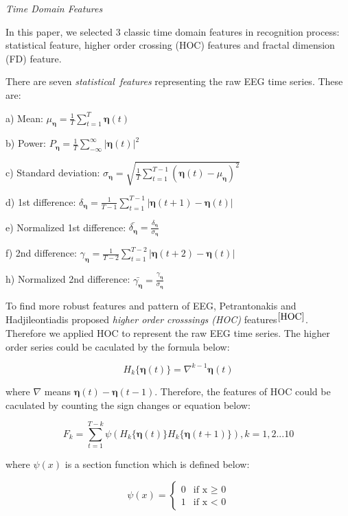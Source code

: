 \documentclass[runningheads,a4paper]{llncs}
\begin{document}
\emph{Time Domain Features}

In this paper, we selected 3 classic time domain features in recognition process: statistical feature,
higher order crossing (HOC) features and fractal dimension (FD) feature.

There are seven \emph{statistical\ features} representing the
raw EEG time series. These are:

a) Mean: ${\mu}_{\bm{\eta}} = \frac{1}{T}\sum_{t=1}^T \bm{\eta}(t)$

b) Power: $P_{\bm{\eta}} = \frac{1}{T}\sum_{-\infty}^{\infty} |{\bm{\eta}}(t)|^2 $

c) Standard deviation: $\sigma_{\bm{\eta}} = \sqrt{ \frac{1}{T} \sum_{t=1}^{T-1} ({\bm{\eta}}(t) - {\mu}_{\bm{\eta}})^2 }$

d) 1st difference: $\delta_{\bm{\eta}} = \frac{1}{T-1}\sum_{t=1}^{T-1}|{\bm{\eta}}(t+1) - {\bm{\eta}}(t)|$

e) Normalized 1st difference: $ \bar{\delta_{\bm{\eta}}} = \frac{ \delta_{\bm{\eta}}}{\sigma_{\bm{\eta}}}$

f) 2nd difference: $\gamma_{\bm{\eta}} = \frac{1}{T-2}\sum_{t=1}^{T-2}|{\bm{\eta}}(t+2) - {\bm{\eta}}(t)|$

h) Normalized 2nd difference: $\bar{\gamma_{\bm{\eta}}} = \frac{\gamma_{\bm{\eta}}}{\sigma_{\bm{\eta}}}$

To find more robust features and pattern of EEG, Petrantonakis and Hadjileontiadis proposed
 \emph{higher order crosssings (HOC)} features$^{\cite{HOC}}$. Therefore we applied HOC to represent the raw EEG time series.
The higher order series could be caculated by the formula below:

\begin{equation}
    H_k\{{\bm{\eta}}(t)\} = \nabla^{k-1}{\bm{\eta}}(t)
\end{equation}

where $\nabla$ means ${\bm{\eta}}(t) - {\bm{\eta}}(t-1)$. Therefore, the features
of HOC could be caculated by counting the sign changes or equation below:

\begin{equation}
  F_k = \sum_{t=1}^{T-k}\psi(H_k\{{\bm{\eta}}(t)\}H_k\{{\bm{\eta}}(t+1)\}), k = 1,2...10
\end{equation}

where $\psi(x)$ is a section function which is defined below:

\begin{equation}
   \psi(x)=
   \begin{cases}
   0 &\mbox{if x $\geq$ 0}\\
   1 &\mbox{if  x $<$ 0}
   \end{cases}
\end{equation}
\end{document}
